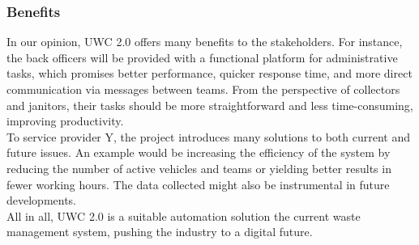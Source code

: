 \documentclass[a4paper, 13pt]{article}
\begin{document}
\subsubsection{Benefits}
In our opinion, UWC 2.0 offers many benefits to the stakeholders. For instance, the back officers will be provided with a functional platform for administrative tasks, which promises better performance, quicker response time, and more direct communication via messages between teams. From the perspective of collectors and janitors, their tasks should be more straightforward and less time-consuming, improving productivity. \\
To service provider Y, the project introduces many solutions to both current and future issues. An example would be increasing the efficiency of the system by reducing the number of active vehicles and teams or yielding better results in fewer working hours. The data collected might also be instrumental in future developments. \\
All in all, UWC 2.0 is a suitable automation solution the current waste management system, pushing the industry to a digital future.
\\
\end{document}
